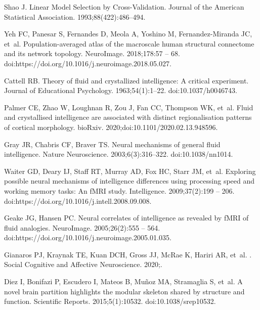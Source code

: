 \documentclass[10pt,letterpaper]{article}
\begin{document}
\begin{thebibliography}{10}
Shao J.
\newblock Linear Model Selection by Cross-Validation.
\newblock Journal of the American Statistical Association.
  1993;88(422):486--494.

Yeh FC, Panesar S, Fernandes D, Meola A, Yoshino M, Fernandez-Miranda JC,
  et~al.
\newblock Population-averaged atlas of the macroscale human structural
  connectome and its network topology.
\newblock NeuroImage. 2018;178:57 -- 68.
\newblock doi:{https://doi.org/10.1016/j.neuroimage.2018.05.027}.

Cattell RB.
\newblock Theory of fluid and crystallized intelligence: A critical experiment.
\newblock Journal of Educational Psychology. 1963;54(1):1–22.
\newblock doi:{10.1037/h0046743}.

Palmer CE, Zhao W, Loughnan R, Zou J, Fan CC, Thompson WK, et~al.
\newblock Fluid and crystallised intelligence are associated with distinct
  regionalisation patterns of cortical morphology.
\newblock bioRxiv. 2020;doi:{10.1101/2020.02.13.948596}.

Gray JR, Chabris CF, Braver TS.
\newblock Neural mechanisms of general fluid intelligence.
\newblock Nature Neuroscience. 2003;6(3):316--322.
\newblock doi:{10.1038/nn1014}.

Waiter GD, Deary IJ, Staff RT, Murray AD, Fox HC, Starr JM, et~al.
\newblock Exploring possible neural mechanisms of intelligence differences
  using processing speed and working memory tasks: An fMRI study.
\newblock Intelligence. 2009;37(2):199 -- 206.
\newblock doi:{https://doi.org/10.1016/j.intell.2008.09.008}.

Geake JG, Hansen PC.
\newblock Neural correlates of intelligence as revealed by fMRI of fluid
  analogies.
\newblock NeuroImage. 2005;26(2):555 -- 564.
\newblock doi:{https://doi.org/10.1016/j.neuroimage.2005.01.035}.

Gianaros PJ, Kraynak TE, Kuan DCH, Gross JJ, McRae K, Hariri AR, et~al.
.
\newblock Social Cognitive and Affective Neuroscience. 2020;.

Diez I, Bonifazi P, Escudero I, Mateos B, Mu{\~n}oz MA, Stramaglia S, et~al.
\newblock A novel brain partition highlights the modular skeleton shared by
  structure and function.
\newblock Scientific Reports. 2015;5(1):10532.
\newblock doi:{10.1038/srep10532}.


\end{thebibliography}
\end{document}
